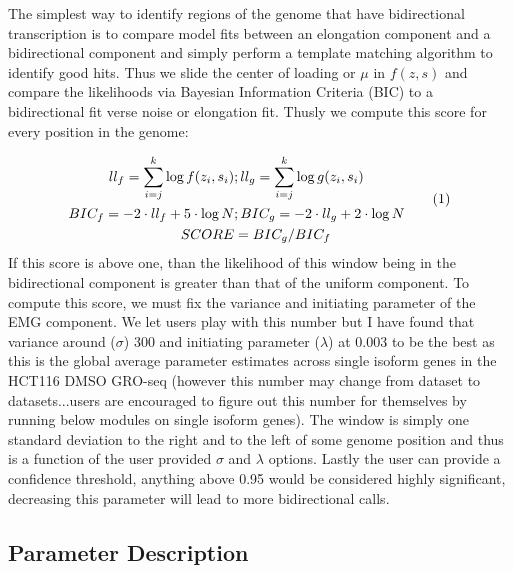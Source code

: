 \documentclass{article}
\newcommand\numberthis{\addtocounter{equation}{1}\tag{\theequation}}
\theoremstyle{definition}
\begin{document}
The simplest way to identify regions of the genome that have bidirectional transcription is to compare model fits between an elongation component and a bidirectional component and simply perform a template matching algorithm to identify good hits. Thus we slide the center of loading or $\mu$
in $f(z,s)$ and compare the likelihoods via Bayesian Information Criteria (BIC) to a bidirectional fit verse noise or elongation fit. Thusly we compute this score for every position in the genome:

\begin{displaymath}
\begin{split}
ll_f 		= \sum_{i=j}^{k} \log{f(z_i, s_i)}&; ll_g = \sum_{i=j}^{k} \log{g(z_i, s_i)}\\
BIC_f 	= -2\cdot ll_f  + 5\cdot\log{N}&;BIC_g 	= -2\cdot ll_g +2\cdot\log{N}\\
SCORE 	&= BIC_g/BIC_f \\
\end{split}\numberthis \label{eqn_4}
\end{displaymath}
If this score is above one, than the likelihood of this window being in the bidirectional component is greater than that of the uniform component. To compute this score, we must fix the variance and initiating parameter of the EMG component. We let users play with this number but I have found that variance around ($\sigma$) 300 and initiating parameter ($\lambda$) at 0.003 to be the best as this is the global average parameter estimates across single isoform genes in the HCT116 DMSO GRO-seq (however this number may change from dataset to datasets...users are encouraged to figure out this number for themselves by running below modules on single isoform genes). The window is simply one standard deviation to the right and to the left of some genome position and thus is a function of the user provided $\sigma$ and $\lambda$ options. Lastly the user can provide a confidence threshold, anything above 0.95 would be considered highly significant, decreasing this parameter will lead to more bidirectional calls. 

\subsection{Parameter Description}
\end{document}
